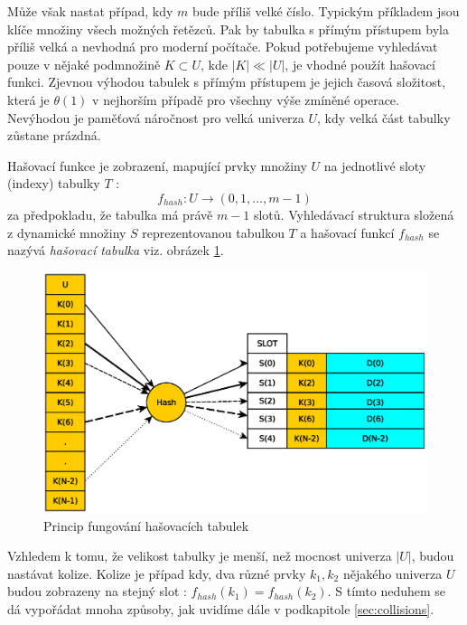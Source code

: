 Může však nastat případ, kdy $m$ bude příliš velké číslo. Typickým příkladem
jsou klíče množiny všech možných řetězců. Pak by tabulka s přímým přístupem
byla příliš velká a nevhodná pro moderní počítače. Pokud potřebujeme 
vyhledávat pouze v nějaké podmnožině $K \subset U$, kde $|K| \ll |U|$, je 
vhodné použít hašovací funkci. Zjevnou výhodou tabulek s přímým přístupem je jejich časová složitost, která je $\theta (1)$
v nejhorším případě pro všechny výše zmíněné operace. Nevýhodou je paměťová náročnost
pro velká univerza $U$, kdy velká část tabulky zůstane prázdná.

Hašovací funkce je zobrazení, mapující prvky množiny $U$ na jednotlivé 
sloty (indexy) tabulky $T$ :
$$ f_{hash} : U \to (0,1,\ldots,m-1)$$
za předpokladu, že tabulka má právě $m-1$ slotů. Vyhledávací struktura 
složená z dynamické množiny $S$ reprezentovanou tabulkou $T$ a hašovací 
funkcí $f_{hash}$ se nazývá \textit{hašovací tabulka} 
viz. obrázek \ref{fig:hash_table_example}.

\begin{figure}[!ht]
	\centering
	\includegraphics[scale=0.6]{fig/hash_table_example}	
	\caption{Princip fungování hašovacích tabulek}
	\label{fig:hash_table_example}
\end{figure}
 
Vzhledem k tomu, že velikost tabulky je menší, než mocnost univerza $|U|$,
budou nastávat kolize. Kolize je případ kdy, dva různé prvky $k_{1}, k_{2}$ nějakého univerza
 $U$ budou zobrazeny na stejný slot : 
$f_{hash} (k_{1}) = f_{hash} (k_{2})$. S tímto neduhem se dá vypořádat mnoha 
způsoby, jak uvidíme dále v podkapitole \ref{sec:collisions}.

